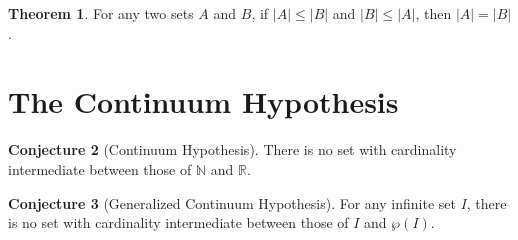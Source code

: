\documentclass[12pt]{article}
\theoremstyle{definition}
\newtheorem{theorem}{Theorem}[section]
\newtheorem{conj}[theorem]{Conjecture}
\begin{document}
\begin{theorem}
For any two sets $A$ and $B$, if $|A| \leqslant |B|$ and $|B| \leqslant |A|$, then $|A| = |B|$.
\end{theorem}

\section{The Continuum Hypothesis}

\begin{conj} [Continuum Hypothesis]
There is no set with cardinality intermediate between those of $\mathbb{N}$ and $\mathbb{R}$.
\end{conj}

\begin{conj} [Generalized Continuum Hypothesis]
For any infinite set $I$, there is no set with cardinality intermediate between those of $I$ and $\wp(I)$.
\end{conj}
\end{document}
